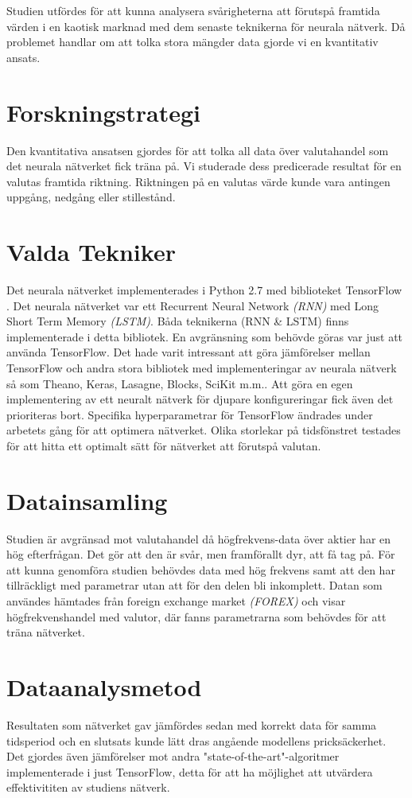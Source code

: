 Studien utfördes för att kunna analysera svårigheterna att förutspå framtida
värden i en kaotisk marknad med dem senaste teknikerna för neurala nätverk. Då
problemet handlar om att tolka stora mängder data gjorde vi en kvantitativ
ansats.

\section{Forskningstrategi}
Den kvantitativa ansatsen gjordes för att tolka all data över valutahandel som
det neurala nätverket fick träna på. Vi studerade dess predicerade resultat för
en valutas framtida riktning. Riktningen på en valutas värde kunde vara antingen
uppgång, nedgång eller stillestånd.

\section{Valda Tekniker}
Det neurala nätverket implementerades i Python 2.7 med biblioteket TensorFlow
\citep{tensorflow2015-whitepaper}. Det neurala nätverket var ett Recurrent
Neural Network \textit{(RNN)} med Long Short Term Memory \textit{(LSTM)}. Båda
teknikerna (RNN \& LSTM) finns implementerade i detta bibliotek. En avgränsning
som behövde göras var just att använda TensorFlow. Det hade varit intressant att
göra jämförelser mellan TensorFlow och andra stora bibliotek med
implementeringar av neurala nätverk så som Theano, Keras, Lasagne, Blocks,
SciKit m.m.. Att göra en egen implementering av ett neuralt nätverk för djupare
konfigureringar fick även det prioriteras bort. Specifika hyperparametrar för
TensorFlow ändrades under arbetets gång för att optimera nätverket. Olika
storlekar på tidsfönstret testades för att hitta ett optimalt sätt för nätverket
att förutspå valutan.


\section{Datainsamling}
Studien är avgränsad mot valutahandel då högfrekvens-data över aktier har en hög
efterfrågan. Det gör att den är svår, men framförallt dyr, att få tag på. För
att kunna genomföra studien behövdes data med hög frekvens samt att den har
tillräckligt med parametrar utan att för den delen bli inkomplett. Datan som
användes hämtades från foreign exchange market \textit{(FOREX)} och visar
högfrekvenshandel med valutor, där fanns parametrarna som behövdes för att träna
nätverket.

\section{Dataanalysmetod}
Resultaten som nätverket gav jämfördes sedan med korrekt data för samma
tidsperiod och en slutsats kunde lätt dras angående modellens
pricksäckerhet. Det gjordes även jämförelser mot andra
"state-of-the-art"-algoritmer implementerade i just TensorFlow, detta för att ha
möjlighet att utvärdera effektivititen av studiens nätverk.

